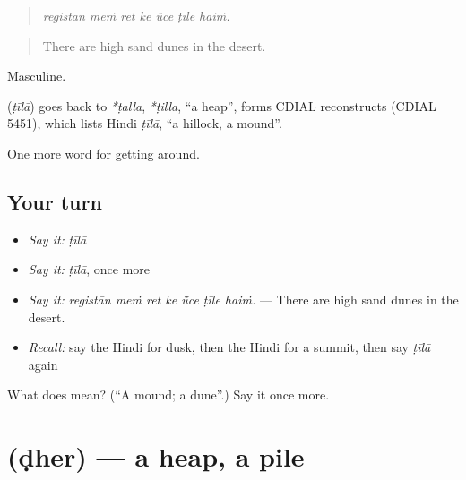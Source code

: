 \begin{quote}
      
\end{quote}

\begin{quote}
\emph{registān meṁ ret ke ū̃ce ṭīle haiṁ.}
\end{quote}

\begin{quote}
There are high sand dunes in the desert.
\end{quote}

Masculine.

\begin{cousinweb}
\textbf{} (\emph{ṭīlā}) goes back to \emph{*ṭalla}, \emph{*ṭilla}, \textquotedblleft{}a heap\textquotedblright{}, forms CDIAL reconstructs (CDIAL 5451), which lists Hindi \emph{ṭīlā}, \textquotedblleft{}a hillock, a mound\textquotedblright{}.
\end{cousinweb}

\begin{grammarlens}[title={What you've built}]
One more word for getting around.
\end{grammarlens}

\subsection*{Your turn}
\begin{itemize}
\raggedright
  \item \emph{Say it:} \emph{ṭīlā}
  \item \emph{Say it:} \emph{ṭīlā}, once more
  \item \emph{Say it:} \emph{registān meṁ ret ke ū̃ce ṭīle haiṁ.} — There are high sand dunes in the desert.
  \item \emph{Recall:} say the Hindi for dusk, then the Hindi for a summit, then say \emph{ṭīlā} again
\end{itemize}

\begin{tcolorbox}[breakable,colback=teal!4,colframe=teal!35!black,title={Before you move on}]
What does  mean? (\textquotedblleft{}A mound; a dune\textquotedblright{}.) Say it once more.
\end{tcolorbox}
\section[\texorpdfstring{\hi{ढेर} (ḍher)}{ढेर (ḍher)}]{ (ḍher) — a heap, a pile}

